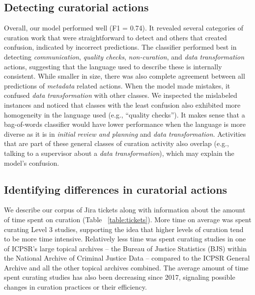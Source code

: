 \documentclass[conference]{IEEEtran}
\begin{document}
\subsection{Detecting curatorial actions}
\label{detecting-curation-activities}
Overall, our model performed well (F1 = 0.74). It revealed several categories of curation work that were straightforward to detect and others that created confusion, indicated by incorrect predictions. The classifier performed best in detecting \textit{communication}, \textit{quality checks}, \textit{non-curation}, and \textit{data transformation} actions, suggesting that the language used to describe these is internally consistent. While smaller in size, there was also complete agreement between all predictions of \textit{metadata} related actions. When the model made mistakes, it confused \textit{data transformation} with other classes. We inspected the mislabeled instances and noticed that classes with the least confusion also exhibited more homogeneity in the language used (e.g., “quality checks”). It makes sense that a bag-of-words classifier would have lower performance when the language is more diverse as it is in \textit{initial review and planning} and \textit{data transformation}. Activities that are part of these general classes of curation activity also overlap (e.g., talking to a supervisor about a \textit{data transformation}), which may explain the model’s confusion. 

\subsection{Identifying differences in curatorial actions}
\label{identifying-differences-curatorial-actions}
We describe our corpus of Jira tickets along with information about the amount of time spent on curation (Table ~\ref{table:tickets}). More time on average was spent curating Level 3 studies, supporting the idea that higher levels of curation tend to be more time intensive. Relatively less time was spent curating studies in one of ICPSR’s large topical archives – the Bureau of Justice Statistics (BJS) within the National Archive of Criminal Justice Data – compared to the ICPSR General Archive and all the other topical archives combined. The average amount of time spent curating studies has also been decreasing since 2017, signaling possible changes in curation practices or their efficiency.  
\end{document}
